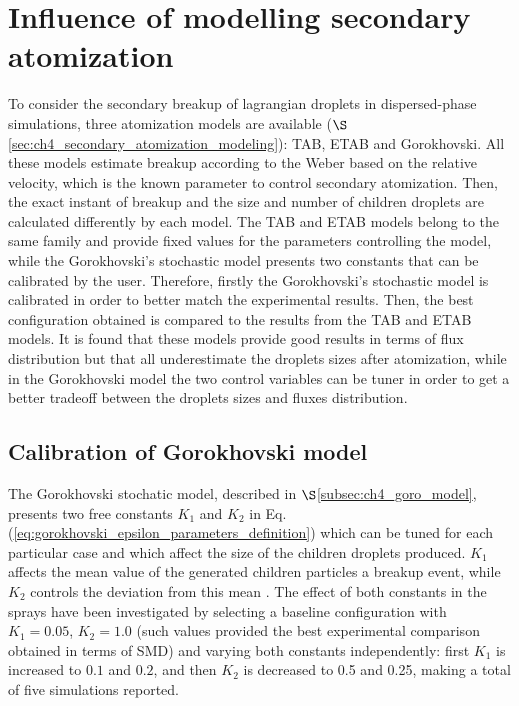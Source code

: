 \section{Influence of modelling secondary atomization}
\label{sec:SLI_LGS_secondary_breakup_models}

To consider the secondary breakup of lagrangian droplets in dispersed-phase simulations, three atomization models are available ($\S$\ref{sec:ch4_secondary_atomization_modeling}): TAB, ETAB and Gorokhovski. All these models estimate breakup according to the Weber based on the relative velocity, which is the known parameter to control secondary atomization. Then, the exact instant of breakup and the size and number of children droplets are calculated differently by each model. The TAB and ETAB models belong to the same family and provide fixed values for the parameters controlling the model, while the Gorokhovski's stochastic model presents two constants that can be calibrated by the user. Therefore, firstly the Gorokhovski's stochastic model is calibrated in order to better match the experimental results.  Then, the best configuration obtained is compared to the results from the TAB and ETAB models. It is found that these models provide good results in terms of flux distribution but that all underestimate the droplets sizes after atomization, while in the Gorokhovski model the two control variables can be tuner in order to get a better tradeoff between the droplets sizes and fluxes distribution.

\subsection{Calibration of Gorokhovski model}
\label{subsec:second_atom_goro_calibration}

The Gorokhovski stochatic model, described in $\S$\ref{subsec:ch4_goro_model}, presents two free constants $K_1$ and $K_2$ in Eq. (\ref{eq:gorokhovski_epsilon_parameters_definition}) which can be tuned for each particular case and which affect the size of the children droplets produced.  $K_1$ affects the mean value of the generated children particles a breakup event, while $K_2$ controls the deviation from this mean . The effect of both constants in the sprays have been investigated by selecting a baseline configuration with $K_1 = 0.05$, $K_2 = 1.0$ (such values provided the best experimental comparison obtained in terms of SMD) and varying both constants independently: first $K_1$ is increased to $0.1$ and $0.2$, and then $K_2$ is decreased to 0.5 and 0.25, making a total of five simulations reported. 


